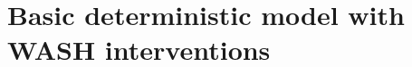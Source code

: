 \documentclass[12pt,a4paper]{article}
\theoremstyle{plain}%
\theoremstyle{definition}
\theoremstyle{remark}
\begin{document}
	
	
%	
	\section{Basic deterministic model with WASH interventions}
	\label{sec:model1}
\end{document}
